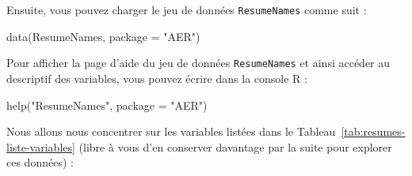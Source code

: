 \documentclass[
  11pt,
]{book}
\newenvironment{Shaded}{\begin{snugshade}}{\end{snugshade}}
\newcommand{\AttributeTok}[1]{\textcolor[rgb]{0.77,0.63,0.00}{#1}}
\newcommand{\FunctionTok}[1]{\textcolor[rgb]{0.00,0.00,0.00}{#1}}
\newcommand{\NormalTok}[1]{#1}
\newcommand{\StringTok}[1]{\textcolor[rgb]{0.31,0.60,0.02}{#1}}
\numberwithin{equation}{section}
\numberwithin{countremarque}{section}
\begin{document}
Ensuite, vous pouvez charger le jeu de données \texttt{ResumeNames} comme suit :

\begin{Shaded}
\begin{Highlighting}[]
\FunctionTok{data}\NormalTok{(ResumeNames, }\AttributeTok{package =} \StringTok{"AER"}\NormalTok{)}
\end{Highlighting}
\end{Shaded}

Pour afficher la page d'aide du jeu de données \texttt{ResumeNames} et ainsi accéder au descriptif des variables, vous pouvez écrire dans la console R :

\begin{Shaded}
\begin{Highlighting}[]
\FunctionTok{help}\NormalTok{(}\StringTok{"ResumeNames"}\NormalTok{, }\AttributeTok{package =} \StringTok{"AER"}\NormalTok{)}
\end{Highlighting}
\end{Shaded}

Nous allons nous concentrer sur les variables listées dans le Tableau~\ref{tab:resumes-liste-variables} (libre à vous d'en conserver davantage par la suite pour explorer ces données) :
\end{document}
